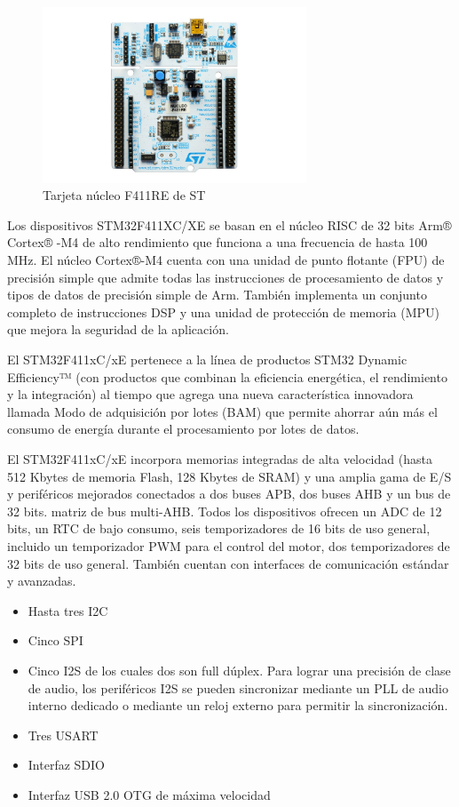 \begin{figure}[htb]
	\centering
	\includegraphics[width=0.7\textwidth]{capitulo1/f411re.jpg}
	\caption{Tarjeta núcleo F411RE de ST}
	\label{cap1:001}
\end{figure} 

Los dispositivos STM32F411XC/XE se basan en el núcleo RISC de 32 bits Arm® Cortex® -M4 de alto rendimiento que funciona a una frecuencia de hasta 100 MHz. El núcleo Cortex®-M4 cuenta con una unidad de punto flotante (FPU) de precisión simple que admite todas las instrucciones de procesamiento de datos y tipos de datos de precisión simple de Arm. También implementa un conjunto completo de instrucciones DSP y una unidad de protección de memoria (MPU) que mejora la seguridad de la aplicación.

El STM32F411xC/xE pertenece a la línea de productos STM32 Dynamic Efficiency™ (con productos que combinan la eficiencia energética, el rendimiento y la integración) al tiempo que agrega una nueva característica innovadora llamada Modo de adquisición por lotes (BAM) que permite ahorrar aún más el consumo de energía durante el procesamiento por lotes de datos.

El STM32F411xC/xE incorpora memorias integradas de alta velocidad (hasta 512 Kbytes de memoria Flash, 128 Kbytes de SRAM) y una amplia gama de E/S y periféricos mejorados conectados a dos buses APB, dos buses AHB y un bus de 32 bits. matriz de bus multi-AHB. Todos los dispositivos ofrecen un ADC de 12 bits, un RTC de bajo consumo, seis temporizadores de 16 bits de uso general, incluido un temporizador PWM para el control del motor, dos temporizadores de 32 bits de uso general. También cuentan con interfaces de comunicación estándar y avanzadas.

\begin{itemize}
	\item Hasta tres I2C
	\item Cinco SPI
	\item Cinco I2S de los cuales dos son full dúplex. Para lograr una precisión de clase de audio, los periféricos I2S se pueden sincronizar mediante un PLL de audio interno dedicado o mediante un reloj externo para permitir la sincronización.
	\item Tres USART
	\item Interfaz SDIO
	\item Interfaz USB 2.0 OTG de máxima velocidad
\end{itemize}


